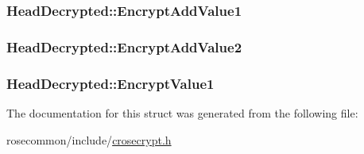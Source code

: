 \subsubsection[{\texorpdfstring{Encrypt\+Add\+Value1}{EncryptAddValue1}}]{ Head\+Decrypted\+::\+Encrypt\+Add\+Value1}\hypertarget{structHeadDecrypted_a5351f06e5c6e8830a3f7d48bae5b62a6}{}\label{structHeadDecrypted_a5351f06e5c6e8830a3f7d48bae5b62a6}
\subsubsection[{\texorpdfstring{Encrypt\+Add\+Value2}{EncryptAddValue2}}]{ Head\+Decrypted\+::\+Encrypt\+Add\+Value2}\hypertarget{structHeadDecrypted_aecd46a361fa6ff8dd887cac6fd59563e}{}\label{structHeadDecrypted_aecd46a361fa6ff8dd887cac6fd59563e}
\subsubsection[{\texorpdfstring{Encrypt\+Value1}{EncryptValue1}}]{ Head\+Decrypted\+::\+Encrypt\+Value1}\hypertarget{structHeadDecrypted_ae1e522d691d3039f29a31f5f3183e99a}{}\label{structHeadDecrypted_ae1e522d691d3039f29a31f5f3183e99a}


The documentation for this struct was generated from the following file\+:\begin{DoxyCompactItemize}
\item 
rosecommon/include/\hyperlink{crosecrypt_8h}{crosecrypt.\+h}\end{DoxyCompactItemize}
